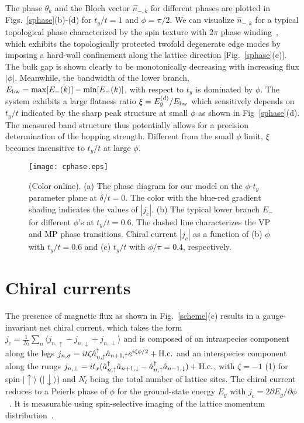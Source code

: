 \documentclass[twocolumn,prl,superscriptaddress,amsmath,amssymb]{revtex4} %
\begin{document}
The phase $\theta_k$ and the Bloch vector $\hat{n}_{-,k}$ for different phases are plotted in Figs.~\ref{sphase}(b)-(d) for $t_y/t=1$ and $\phi=\pi/2$. We can visualize $\hat{n}_{-,k}$ for a typical topological phase characterized by the spin texture
with $2\pi$ phase winding~\cite{Hugel2014}, which exhibits the topologically protected twofold degenerate edge modes by imposing a hard-wall confinement along the lattice direction [Fig.~\ref{sphase}(e)]. The bulk gap is shown clearly to be monotonically decreasing with increasing flux $|\phi|$. Meanwhile,  the bandwidth of the lower branch, $E_{\rm{bw}}=\max[E_-(k)]-\min[E_-(k)]$, with respect to $t_y$ is dominated by $\phi$. The system exhibits a large flatness ratio $\xi=E_{g}^{(d)}/E_{\rm{bw}}$ which sensitively depends on $t_y/t$ indicated by the sharp peak structure at small $\phi$ as shown in Fig~\ref{sphase}(d). The measured band structure thus potentially allows for a precision determination of the hopping strength. Different from the small $\phi$ limit, $\xi$ becomes insensitive to $t_y/t$ at large $\phi$.

\begin{figure}[ht]
\texttt{[image: cphase.eps]}
\caption{(Color online). (a) The phase diagram for our model on the $\phi$-$t_y$ parameter plane at $\delta/t=0$. The color with the blue-red gradient shading indicates the values of $|{j}_c|$. (b) The typical lower branch $E_-$ for different $\phi$'s at $t_y/t=0.6$. The dashed line characterizes the VP and MP phase transitions. Chiral current $|{j}_c|$ as a function of (b) $\phi$ with $t_y/t=0.6$ and (c) $t_y/t$ with $\phi/\pi=0.4$, respectively.}
\label{cphase}
\end{figure}

\section{Chiral currents}\label{current}
The presence of magnetic flux as shown in Fig.~\ref{scheme}(c) results in a gauge-invariant net chiral current, which takes the form $j_c= \frac{1}{N_l}\sum_n\langle j_{n,\uparrow} -j_{n,\downarrow} + j_{n,\perp}\rangle$
and is composed of an intraspecies component along the legs $j_{n, \sigma} = {it\zeta} \hat{a}^\dag_{n,\uparrow} \hat{a}_{n+1,\uparrow} e^{i\zeta \phi/2}+ \rm{ H.c.}$ and an interspecies component along the rungs $j_{n,\perp}= {it_x}(\hat{a}^\dag_{n,\uparrow}  \hat{a}_{n+1,\downarrow} - \hat{a}^\dag_{n,\uparrow} \hat{a}_{n-1,\downarrow})+\rm{ H.c.}$, with $\zeta=-1$ (1) for spin-$|\uparrow\rangle$ ($|\downarrow\rangle$) and $N_l$ being the total number of lattice sites. The chiral current reduces to a Peierls phase of $\phi$ for the ground-state energy $E_g$ with $j_c=2\partial E_g/\partial \phi$~\cite{Greschner15}. It is measurable using spin-selective imaging of the lattice momentum distribution~\cite{Mancini15}.
\end{document}
